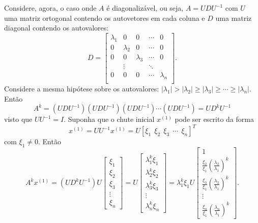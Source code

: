 Considere, agora, o caso onde $A$ é diagonalizável, ou seja, $A=U D U^{-1}$ com $U$ uma matriz ortogonal contendo os autovetores em cada coluna e $D$ uma matriz diagonal contendo os autovalores:
\begin{equation}
  D=\begin{bmatrix}
      \lambda_1&0&0&\cdots&0\\
      0&\lambda_2&0&\cdots&0\\
      0&  0&\lambda_3&\cdots&0\\
      &\vdots& &\ddots&\\
      0&  0&0&\cdots&\lambda_n\\
    \end{bmatrix}.
\end{equation}
Considere a mesma hipótese sobre os autovalores: $|\lambda_1|>|\lambda_2|\geq |\lambda_3|\geq \cdots\geq |\lambda_n|$. Então
\begin{equation}
  A^k=(U D U^{-1})(U D U^{-1})(U D U^{-1})\cdots (U D U^{-1})=UD^kU^ {-1}
\end{equation}
visto que $UU^{-1} = I$. Suponha que o chute inicial $x^{(1)}$ pode ser escrito da forma
\begin{equation}
  x^{(1)} = UU^ {-1}x^{(1)} = U[\xi_1\ \ \xi_2\ \ \xi_3\ \ \cdots \ \ \xi_n]^T
\end{equation}
com $\xi_1\neq 0$. Então
\begin{equation}
  A^kx^{(1)} = (UD^kU^{-1})U\begin{bmatrix} \xi_1\\ \xi_2\\ \xi_3\\ \vdots \\ \xi_n\end{bmatrix} = U\begin{bmatrix}\lambda_1^k\xi_1\\ \lambda_2^k\xi_2\\ \lambda_3^k\xi_3\\ \vdots \\ \lambda_n^k\xi_n\end{bmatrix} = \lambda_1^k\xi_1U\begin{bmatrix} 1\\ \frac{\xi_2}{\xi_1}\left(\frac{\lambda_2}{\lambda_1}\right)^k\\ \frac{\xi_3}{\xi_1}\left(\frac{\lambda_3}{\lambda_1}\right)^k\\ \vdots \\ \frac{\xi_n}{\xi_1}\left(\frac{\lambda_n}{\lambda_1}\right)^k\end{bmatrix}.
\end{equation}
